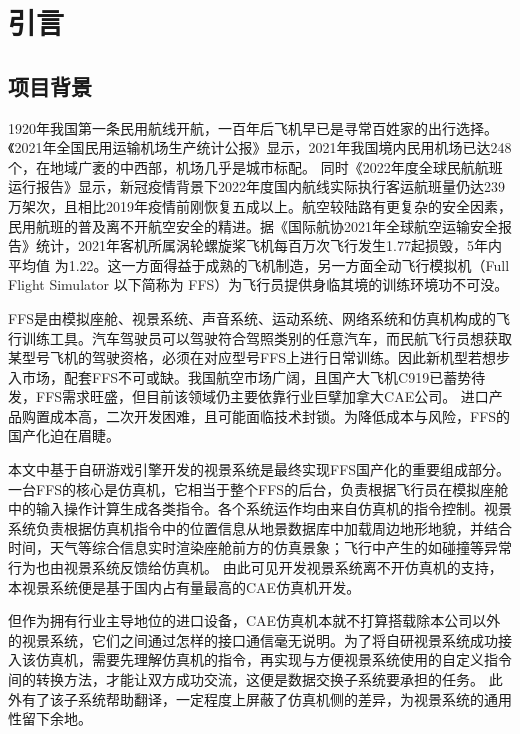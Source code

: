 \chapter{引言}
\section{项目背景}
1920年我国第一条民用航线开航，一百年后飞机早已是寻常百姓家的出行选择。《2021年全国民用运输机场生产统计公报》\cite{minhang}显示，2021年我国境内民用机场已达248个，在地域广袤的中西部，机场几乎是城市标配。
同时《2022年度全球民航航班运行报告》\cite{variflight}显示，新冠疫情背景下2022年度国内航线实际执行客运航班量仍达239万架次，且相比2019年疫情前刚恢复五成以上。航空较陆路有更复杂的安全因素，民用航班的普及离不开航空安全的精进。据《国际航协2021年全球航空运输安全报告》\cite{iata}统计，2021年客机所属涡轮螺旋桨飞机每百万次飞行发生1.77起损毁，5年内平均值
为1.22。这一方面得益于成熟的飞机制造，另一方面全动飞行模拟机（Full Flight Simulator 以下简称为 FFS）为飞行员提供身临其境的训练环境功不可没。
\par
FFS是由模拟座舱、视景系统、声音系统、运动系统、网络系统和仿真机构成的飞行训练工具\cite{simulator3}。汽车驾驶员可以驾驶符合驾照类别的任意汽车，而民航飞行员想获取某型号飞机的驾驶资格，必须在对应型号FFS上进行日常训练。因此新机型若想步入市场，配套FFS不可或缺。我国航空市场广阔，且国产大飞机C919已蓄势待发，FFS需求旺盛，但目前该领域仍主要依靠行业巨擘加拿大CAE公司。
进口产品购置成本高，二次开发困难，且可能面临技术封锁。为降低成本与风险，FFS的国产化迫在眉睫。
\par
本文中基于自研游戏引擎开发的视景系统是最终实现FFS国产化的重要组成部分。
一台FFS的核心是仿真机，它相当于整个FFS的后台，负责根据飞行员在模拟座舱中的输入操作计算生成各类指令。各个系统运作均由来自仿真机的指令控制。视景系统负责根据仿真机指令中的位置信息从地景数据库中加载周边地形地貌，并结合时间，天气等综合信息实时渲染座舱前方的仿真景象；飞行中产生的如碰撞等异常行为也由视景系统反馈给仿真机。
由此可见开发视景系统离不开仿真机的支持，本视景系统便是基于国内占有量最高的CAE仿真机开发。
\par
但作为拥有行业主导地位的进口设备，CAE仿真机本就不打算搭载除本公司以外的视景系统，它们之间通过怎样的接口通信毫无说明。为了将自研视景系统成功接入该仿真机，需要先理解仿真机的指令，再实现与方便视景系统使用的自定义指令间的转换方法，才能让双方成功交流，这便是数据交换子系统要承担的任务。
此外有了该子系统帮助翻译，一定程度上屏蔽了仿真机侧的差异，为视景系统的通用性留下余地。
